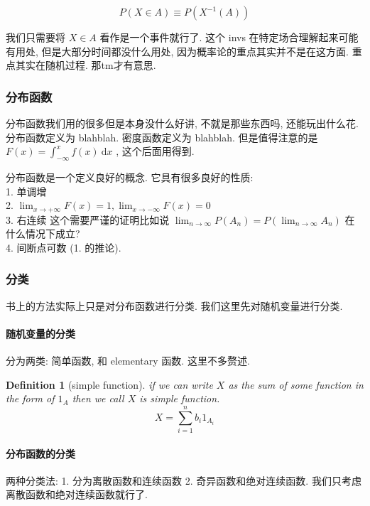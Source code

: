 \documentclass[a4paper, 10pt]{ctexart} %
\newtheorem{definition}{Definition}
\begin{document}
\begin{equation}
    P\left(X \in A\right) \equiv  P\left(X ^{-1} \left(A\right)\right)
\end{equation}

我们只需要将 $X   \in A$ 看作是一个事件就行了. 这个 invs 在特定场合理解起来可能有用处, 但是大部分时间都没什么用处, 因为概率论的重点其实并不是在这方面. 
重点其实在随机过程. 那tm才有意思. 

\subsubsection{分布函数}
分布函数我们用的很多但是本身没什么好讲, 不就是那些东西吗, 还能玩出什么花.
分布函数定义为 blahblah.
密度函数定义为 blahblah. 
但是值得注意的是 $ F\left(x\right)  = \int ^{x} _{-\infty} f\left(x\right) \ \mathrm{d}x$ , 这个后面用得到. 

分布函数是一个定义良好的概念. 它具有很多良好的性质: \\
1. 单调增\\
2. $\lim_{x \to +\infty} F\left(x\right) = 1, \lim_{x \to -\infty} F\left(x\right) = 0$\\
3. 右连续 这个需要严谨的证明比如说 $\lim_{n \to \infty} P\left(A_{n}\right) = P\left(\lim_{n \to \infty}A_{n} \right)$ 在什么情况下成立?\\
4. 间断点可数 (1. 的推论).
\subsubsection{分类}
书上的方法实际上只是对分布函数进行分类. 我们这里先对随机变量进行分类.

\paragraph{随机变量的分类} 分为两类: 简单函数, 和 elementary 函数. 这里不多赘述.
\begin{definition}[simple function]
    if we can write $X$ as the sum of some function in the form of $1_{A}$ then we call $X$ is simple function.
    \[
    X = \sum_{i=1} ^{n} b_{i}1_{A_{i}}
    \]
\end{definition}


\paragraph{分布函数的分类} 两种分类法: 1. 分为离散函数和连续函数 2. 奇异函数和绝对连续函数.
我们只考虑离散函数和绝对连续函数就行了. 
\end{document}
